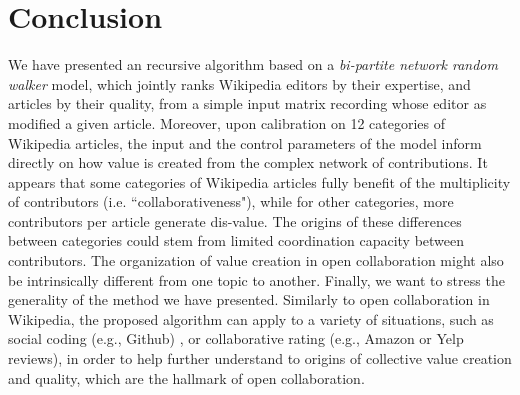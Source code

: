 \section{Conclusion}
We have presented an recursive algorithm based on a {\it bi-partite network random walker} model, which jointly ranks Wikipedia editors by their expertise, and articles by their quality, from a simple input matrix recording whose editor as modified a given article. Moreover, upon calibration on 12 categories of Wikipedia articles, the input and the control parameters of the model inform directly on how value is created from the complex network of contributions. It appears that some categories of Wikipedia articles fully benefit of the multiplicity of contributors (i.e. ``collaborativeness"), while for other categories, more contributors per article generate dis-value. The origins of these differences between categories could stem from limited coordination capacity between contributors. The organization of value creation in open collaboration might also be intrinsically different from one topic to another. Finally, we want to stress the generality of the method we have presented. Similarly to open collaboration in Wikipedia, the proposed algorithm can apply to a variety of  situations, such as social coding (e.g., Github) , or collaborative rating (e.g., Amazon or Yelp reviews), in order to help further understand to origins of collective value creation and quality, which are the hallmark of open collaboration.
